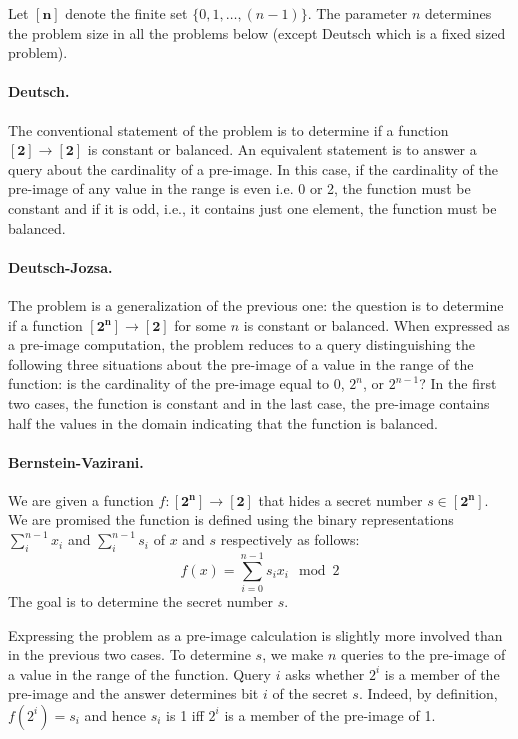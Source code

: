 \documentclass{article}
\newcommand{\finset}[1]{[\mathbf{#1}]}
\begin{document}
Let $\finset{n}$ denote the finite set $\{ 0,1,\ldots,(n-1)\}$. The
parameter $n$ determines the problem size in all the problems below
(except Deutsch which is a fixed sized problem).

\paragraph*{Deutsch.}
The conventional statement of the problem is to determine if a
function $\finset{2} \rightarrow \finset{2}$ is constant or
balanced. An equivalent statement is to answer a query about the
cardinality of a pre-image. In this case, if the cardinality of the
pre-image of any value in the range is even i.e. 0 or 2, the function
must be constant and if it is odd, i.e., it contains just one element,
the function must be balanced.

\paragraph*{Deutsch-Jozsa.}
The problem is a generalization of the previous one: the question is
to determine if a function $\finset{2^n} \rightarrow \finset{2}$ for
some $n$ is constant or balanced. When expressed as a pre-image
computation, the problem reduces to a query distinguishing the
following three situations about the pre-image of a value in the range
of the function: is the cardinality of the pre-image equal to 0,
$2^n$, or $2^{n-1}$? In the first two cases, the function is constant
and in the last case, the pre-image contains half the values in the
domain indicating that the function is balanced.

\paragraph*{Bernstein-Vazirani.}
We are given a function $f : \finset{2^n} \rightarrow \finset{2}$
that hides a secret number $s \in \finset{2^n}$. We are promised the
function is defined using the binary representations $\sum_i^{n-1}
x_i$ and $\sum_i^{n-1} s_i$ of $x$ and $s$ respectively as follows:
\[
f(x) = \sum_{i=0}^{n-1} s_ix_i \mod{2}
\]
The goal is to determine the secret number $s$. 

Expressing the problem as a pre-image calculation is slightly more
involved than in the previous two cases. To determine $s$, we make $n$
queries to the pre-image of a value in the range of the
function. Query $i$ asks whether $2^i$ is a member of the pre-image
and the answer determines bit $i$ of the secret $s$. Indeed, by
definition, $f(2^i) = s_i$ and hence $s_i$ is 1 iff $2^i$ is a member
of the pre-image of 1.
\end{document}
